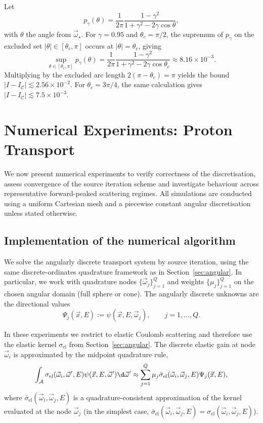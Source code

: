 \documentclass[final]{amsart}
\begin{document}
\begin{example}
Let
\[
  p_{\gamma}(\theta)
  =
  \frac{1}{2\pi}\frac{1-\gamma^{2}}{1+\gamma^{2}-2\gamma\cos\theta},
\]
with $\theta$ the angle from $\vec{\omega}_\star$. For $\gamma=0.95$
and $\theta_c=\pi/2$, the supremum of $p_\gamma$ on the excluded set
$|\theta|\in[\theta_c,\pi]$ occurs at $|\theta|=\theta_c$, giving
\[
  \sup_{\theta\in[\theta_c,\pi]} p_\gamma(\theta)
  =
  \frac{1}{2\pi}\frac{1-\gamma^2}{1+\gamma^2-2\gamma\cos\theta_c}
  \approx 8.16\times 10^{-3}.
\]
Multiplying by the excluded arc length $2(\pi-\theta_c)=\pi$ yields the
bound $|I-I_{\mathcal{C}}|\lesssim 2.56\times 10^{-2}$. For
$\theta_c=3\pi/4$, the same calculation gives
$|I-I_{\mathcal{C}}|\lesssim 7.5\times 10^{-3}$.
\end{example}

\section{Numerical Experiments: Proton Transport}
\label{sec:numericsproton}

We now present numerical experiments to verify correctness of the
discretisation, assess convergence of the source iteration scheme and
investigate behaviour across representative forward-peaked scattering
regimes. All simulations are conducted using a uniform Cartesian mesh
and a piecewise constant angular discretisation unless stated otherwise.

\subsection{Implementation of the numerical algorithm}
\label{subsec:proton_implementation}

We solve the angularly discrete transport system by source iteration,
using the same discrete-ordinates quadrature framework as in
Section~\ref{sec:angular}. In particular, we work with quadrature nodes
$\{\vec{\omega}_j\}_{j=1}^Q$ and weights $\{\mu_j\}_{j=1}^Q$ on the
chosen angular domain (full sphere or cone). The angularly discrete
unknowns are the directional values
\[
  \Psi_j(\vec{x},E) := \psi(\vec{x},E,\vec{\omega}_j),
  \qquad j=1,\dots,Q.
\]

In these experiments we restrict to elastic Coulomb scattering and
therefore use the elastic kernel $\sigma_{\mathrm{el}}$ from
Section~\ref{sec:angular}. The discrete elastic gain at node
$\vec{\omega}_i$ is approximated by the midpoint quadrature rule,
\begin{equation}
  \label{eq:rhs_scattering_numeric}
  \int_{\mathcal A}
  \sigma_{\mathrm{el}}(\vec{\omega}_i,\vec{\omega}',E) 
  \psi(\vec{x},E,\vec{\omega}') \d\vec{\omega}'
   \approx 
  \sum_{j=1}^Q \mu_j 
  \bar\sigma_{\mathrm{el}}(\vec{\omega}_i,\vec{\omega}_j,E) 
  \Psi_j(\vec{x},E),
\end{equation}
where $\bar\sigma_{\mathrm{el}}(\vec{\omega}_i,\vec{\omega}_j,E)$ is a
quadrature-consistent approximation of the kernel evaluated at the node
$\vec{\omega}_j$ (in the simplest case,
$\bar\sigma_{\mathrm{el}}(\vec{\omega}_i,\vec{\omega}_j,E)=
\sigma_{\mathrm{el}}(\vec{\omega}_i,\vec{\omega}_j,E)$).
\end{document}
